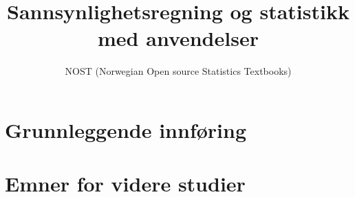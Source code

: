 \documentclass[oneside,norsk,11pt]{book}
\title{Sannsynlighetsregning og statistikk med anvendelser}
\author{NOST (Norwegian Open source Statistics Textbooks)}
\begin{document}


\maketitle
 

\tableofcontents
\mainmatter
\part{Grunnleggende innføring}
 
 
 
 
 
 
 
 

\part{Emner for videre studier}
 
 
 
 
 
 
 
 
 

\appendix
 
 

 
\printindex
\end{document}
